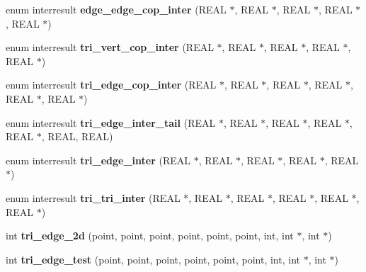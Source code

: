 \begin{DoxyCompactItemize}
\item 
\hypertarget{classtetgenmesh_a67549b76708444d9de2f07bebb16e66a}{enum interresult {\bfseries edge\-\_\-edge\-\_\-cop\-\_\-inter} (R\-E\-A\-L $\ast$, R\-E\-A\-L $\ast$, R\-E\-A\-L $\ast$, R\-E\-A\-L $\ast$, R\-E\-A\-L $\ast$)}\label{classtetgenmesh_a67549b76708444d9de2f07bebb16e66a}

\item 
\hypertarget{classtetgenmesh_a5b58c7f823deb624777dc1cb46bf9a9b}{enum interresult {\bfseries tri\-\_\-vert\-\_\-cop\-\_\-inter} (R\-E\-A\-L $\ast$, R\-E\-A\-L $\ast$, R\-E\-A\-L $\ast$, R\-E\-A\-L $\ast$, R\-E\-A\-L $\ast$)}\label{classtetgenmesh_a5b58c7f823deb624777dc1cb46bf9a9b}

\item 
\hypertarget{classtetgenmesh_a867eb8e09ea0ff368853d643074a00ab}{enum interresult {\bfseries tri\-\_\-edge\-\_\-cop\-\_\-inter} (R\-E\-A\-L $\ast$, R\-E\-A\-L $\ast$, R\-E\-A\-L $\ast$, R\-E\-A\-L $\ast$, R\-E\-A\-L $\ast$, R\-E\-A\-L $\ast$)}\label{classtetgenmesh_a867eb8e09ea0ff368853d643074a00ab}

\item 
\hypertarget{classtetgenmesh_a9df032887b0c29500339274d0e320df2}{enum interresult {\bfseries tri\-\_\-edge\-\_\-inter\-\_\-tail} (R\-E\-A\-L $\ast$, R\-E\-A\-L $\ast$, R\-E\-A\-L $\ast$, R\-E\-A\-L $\ast$, R\-E\-A\-L $\ast$, R\-E\-A\-L, R\-E\-A\-L)}\label{classtetgenmesh_a9df032887b0c29500339274d0e320df2}

\item 
\hypertarget{classtetgenmesh_a4cd9125a3353f150dd12613ce6296fa6}{enum interresult {\bfseries tri\-\_\-edge\-\_\-inter} (R\-E\-A\-L $\ast$, R\-E\-A\-L $\ast$, R\-E\-A\-L $\ast$, R\-E\-A\-L $\ast$, R\-E\-A\-L $\ast$)}\label{classtetgenmesh_a4cd9125a3353f150dd12613ce6296fa6}

\item 
\hypertarget{classtetgenmesh_ac6f746171c756c364858d9b6b9f86453}{enum interresult {\bfseries tri\-\_\-tri\-\_\-inter} (R\-E\-A\-L $\ast$, R\-E\-A\-L $\ast$, R\-E\-A\-L $\ast$, R\-E\-A\-L $\ast$, R\-E\-A\-L $\ast$, R\-E\-A\-L $\ast$)}\label{classtetgenmesh_ac6f746171c756c364858d9b6b9f86453}

\item 
\hypertarget{classtetgenmesh_a6dbb29feba157ab5d848921fa0a11c08}{int {\bfseries tri\-\_\-edge\-\_\-2d} (point, point, point, point, point, point, int, int $\ast$, int $\ast$)}\label{classtetgenmesh_a6dbb29feba157ab5d848921fa0a11c08}

\item 
\hypertarget{classtetgenmesh_ad7597699d6fc2771701cfd85673d39f9}{int {\bfseries tri\-\_\-edge\-\_\-test} (point, point, point, point, point, point, int, int $\ast$, int $\ast$)}\label{classtetgenmesh_ad7597699d6fc2771701cfd85673d39f9}


\end{DoxyCompactItemize}
